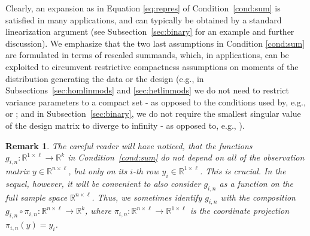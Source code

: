 \documentclass[preprint]{imsart}
\newcommand{\R}{{\mathbb R}}
\newtheorem{remark}[theorem]{Remark}
\numberwithin{equation}{section}
\begin{document}
Clearly, an expansion as in Equation \eqref{eq:repres} of Condition~\ref{cond:sum} is satisfied in many applications, and can typically be obtained by a standard linearization argument (see Subsection~\ref{sec:binary} for an example and further discussion). We emphasize that the two last assumptions in Condition \ref{cond:sum} are formulated in terms of rescaled summands, which, in applications, can be exploited to circumvent restrictive compactness assumptions on moments of the distribution generating the data or the design (e.g., in Subsections~\ref{sec:homlinmods} and \ref{sec:hetlinmods} we do not need to restrict variance parameters to a compact set - as opposed to the conditions used by, e.g., \cite{eicker67} or \cite{Tib15a}; and in Subsection~\ref{sec:binary}, we do not require the smallest singular value of the design matrix to diverge to infinity - as opposed to, e.g., \cite{lv14model}).


\begin{remark}\label{rem:gin}
The careful reader will have noticed, that the functions $g_{i,n}:\R^{1\times\ell}\to\R^k$ in Condition~\ref{cond:sum} do not depend on all of the observation matrix $y\in\R^{n\times\ell}$, but only on its $i$-th row $y_i\in\R^{1\times\ell}$. This is crucial. In the sequel, however, it will be convenient to also consider $g_{i,n}$ as a function on the full sample space $\R^{n\times \ell}$. Thus, we sometimes identify $g_{i,n}$ with the composition $g_{i,n}\circ\pi_{i,n} : \R^{n\times \ell}\to \R^k$, where $\pi_{i,n}:\R^{n\times\ell}\to\R^{1\times\ell}$ is the coordinate projection $\pi_{i,n}(y) = y_i$. 
\end{remark}
\end{document}
